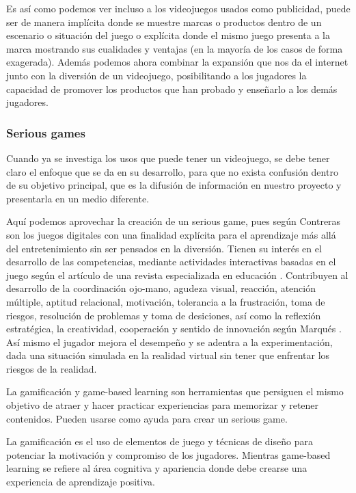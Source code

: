 Es así como podemos ver incluso a los videojuegos usados como publicidad, puede ser de manera implícita donde se muestre marcas o productos dentro de un escenario o situación del juego o explícita donde el mismo juego presenta a la marca mostrando sus cualidades y ventajas (en la mayoría de los casos de forma exagerada). Además podemos ahora combinar la expansión que nos da el internet junto con la diversión de un videojuego, posibilitando a los jugadores la capacidad de promover los productos que han probado y enseñarlo a los demás jugadores. 


\subsubsection{Serious games}
Cuando ya se investiga los usos que puede tener un videojuego, se debe tener claro el enfoque que se da en su desarrollo, para que no exista confusión dentro de su objetivo principal, que es la difusión de información en nuestro proyecto y presentarla en un medio diferente.

Aquí podemos aprovechar la creación de un serious game, pues según Contreras \cite{contreras2016investigacion} son los juegos digitales con una finalidad explícita para el aprendizaje más allá del entretenimiento sin ser pensados en la diversión. Tienen su interés en el desarrollo de las competencias, mediante actividades interactivas basadas en el juego según el artículo de una revista especializada en educación \cite{romero2015serious}.
Contribuyen al desarrollo de la coordinación ojo-mano, agudeza visual, reacción, atención múltiple, aptitud relacional, motivación, tolerancia a la frustración, toma de riesgos, resolución de problemas y toma de desiciones, así como la reflexión estratégica, la creatividad, cooperación y sentido de innovación según Marqués \cite{marques2012}. Así mismo el jugador mejora el desempeño y se adentra a la experimentación, dada una situación simulada en la realidad virtual sin tener que enfrentar los riesgos de la realidad. 
 
La gamificación y game-based learning son herramientas que persiguen el mismo objetivo de atraer y hacer practicar experiencias para memorizar y retener contenidos. Pueden usarse como ayuda para crear un serious game.

La gamificación es el uso de elementos de juego y técnicas de diseño para potenciar la motivación y compromiso de los jugadores. Mientras game-based learning se refiere al área cognitiva y apariencia donde debe crearse una experiencia de aprendizaje positiva.

